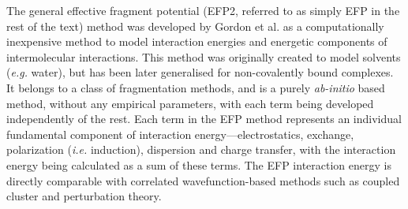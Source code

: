 The general effective fragment potential (EFP2, referred to as simply EFP in the rest of the text) method was developed by Gordon et al. 
\cite{Jensen1998a, Gordon2001a, Gordon2009a, Mullin2009a, Gordon2012a} 
as a computationally inexpensive method to model interaction energies and energetic components of intermolecular interactions. 
This method was originally created to model solvents (\emph{e.g.} water),
\cite{Day1996a, Chen1996a, Adamovic2006a} 
but has been later generalised for non-covalently bound complexes.
\cite{Gordon2007a, Ghosh2010a}
It belongs to a class of fragmentation methods, and is a purely \emph{ab-initio} based method, without any empirical parameters, with each term being developed independently of the rest. 
Each term in the EFP method represents an individual fundamental component of interaction energy---electrostatics, exchange, polarization (\emph{i.e.} induction), dispersion and charge transfer, with the interaction energy being calculated as a sum of these terms. The EFP interaction energy is directly comparable with correlated wavefunction-based methods such as coupled cluster and perturbation theory.


